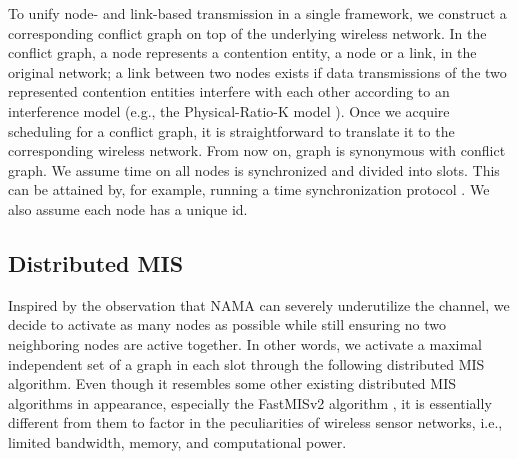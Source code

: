 \documentclass[conference]{IEEEtran}
\begin{document}
To unify node- and link-based transmission in a single framework, we construct a corresponding conflict graph on top of the underlying wireless network. In the conflict graph, a node represents a contention entity, a node or a link, in the original network; a link between two nodes exists if data transmissions of the two represented contention entities interfere with each other according to an interference model (e.g., the Physical-Ratio-K model \cite{prk:zhang:secon10}). Once we acquire scheduling for a conflict graph, it is straightforward to translate it to the corresponding wireless network. From now on, graph is synonymous with conflict graph. We assume time on all nodes is synchronized and divided into slots. This can be attained by, for example, running a time synchronization protocol \cite{prks:zhang:tr}. We also assume each node has a unique id. 

\subsection{Distributed MIS}
Inspired by the observation that NAMA can severely underutilize the channel, we decide to activate as many nodes as possible while still ensuring no two neighboring nodes are active together. In other words, we activate a maximal independent set of a graph in each slot through the following distributed MIS algorithm.
Even though it resembles some other existing distributed MIS algorithms in appearance, especially the FastMISv2 algorithm \cite{fastmisv2}, it is essentially different from them to factor in the peculiarities of wireless sensor networks, i.e., limited bandwidth, memory, and computational power.
\end{document}
